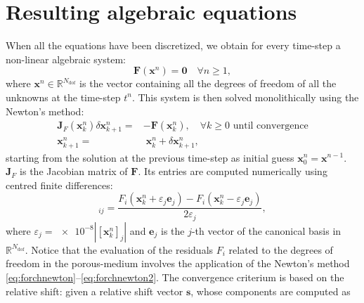 \section{Resulting algebraic equations} \label{sec:algeq}
When all the equations have been discretized, we obtain for every 
time-step a non-linear algebraic system:
\begin{equation}
	\mathbf{F}(\mathbf{x}^n) = \mathbf{0} \quad \forall n\geq 1,
\end{equation}
where $\mathbf{x}^n \in \mathbb{R}^{N_\text{dof}}$ is the vector containing all the degrees of freedom of all the unknowns at the time-step $t^n$. This system is then solved monolithically using the Newton's method:
\begin{align}
\label{eq:linnew}\mathbf{J}_F(\mathbf{x}^n_k) \delta \mathbf{x}^n_{k+1} = &-\mathbf{F}(\mathbf{x}_k^n), \quad \text{$\forall k\geq 0$ until 
	convergence}\\
\mathbf{x}^n_{k+1} = &\;\mathbf{x}^n_k + \delta \mathbf{x}^n_{k+1},
\end{align}
starting from the solution at the previous time-step as initial guess $\mathbf{x}_0^n = \mathbf{x}^{n-1}$.
$\mathbf{J}_F$ is the Jacobian matrix of $\mathbf{F}$. Its entries are computed numerically using centred finite differences:
\begin{equation}
[\mathbf{J}_F]_{ij} = \frac{F_i(\mathbf{x}_k^n + \varepsilon_j \mathbf{e}_j) - F_i(\mathbf{x}_k^n - \varepsilon_j \mathbf{e}_j)}{2\varepsilon_j},
\end{equation}
where $\varepsilon_j=\num{e-8}|[\mathbf{x}_k^n]_j|$ and $\mathbf{e}_j$ is the $j$-th vector of the canonical basis in $\mathbb{R}^{N_\text{dof}}$.
Notice that the evaluation of the residuals $F_i$ related to the degrees of freedom in the porous-medium involves the application of the Newton's method \eqref{eq:forchnewton}--\eqref{eq:forchnewton2}.
The convergence criterium is based on the relative shift: given a relative shift vector $\mathbf{s}$, whose components are computed as
